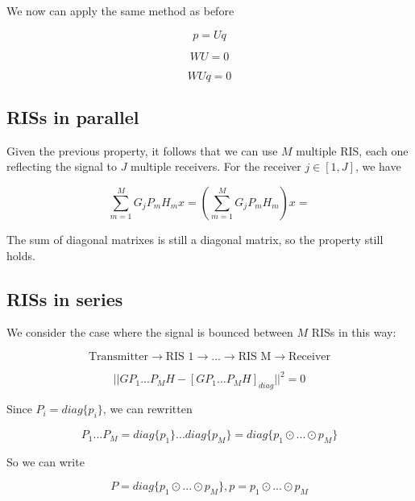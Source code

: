 We now can apply the same method as before

\begin{equation}p = Uq\end{equation}

\begin{equation}WU = 0\end{equation}

\begin{equation}WUq = 0\end{equation}

\subsection{RISs in parallel}

Given the previous property, it follows that we can use $M$ multiple RIS, each one reflecting the signal to $J$ multiple receivers. For the receiver $j \in [1, J]$, we have

\begin{equation}
  \sum_{m=1}^M G_j P_m H_m x = (\sum_{m=1}^M G_j P_m H_m) x =
\end{equation}

The sum of diagonal matrixes is still a diagonal matrix, so the property still holds.

\subsection{RISs in series}

We consider the case where the signal is bounced between $M$ RISs in this way:

\begin{equation}
  \text{Transmitter} \rightarrow \text{RIS 1} \rightarrow ... \rightarrow \text{RIS M} \rightarrow \text{Receiver}
\end{equation}

\begin{equation}
  || GP_1...P_MH - [GP_1...P_MH]_{diag} || ^2 = 0
\end{equation}

Since $P_i = diag\{p_i\}$, we can rewritten

\begin{equation}
  P_1...P_M = diag\{p_1\}...diag\{p_M\} = diag\{p_1 \odot ... \odot p_M\}
\end{equation}

So we can write

\begin{equation}
  P = diag\{p_1 \odot ... \odot p_M\}, p = p_1 \odot ... \odot p_M
\end{equation}

